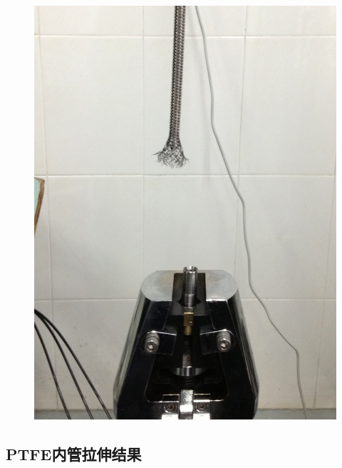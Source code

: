 \begin{figure}
{\includegraphics[height=0.3\textheight]{figure/experiment/E2/fail-2}
\label{fig:fail-2}
}
\label{fig:failure-experiment-ii}
\end{figure}


\subsection{PTFE内管拉伸结果}

